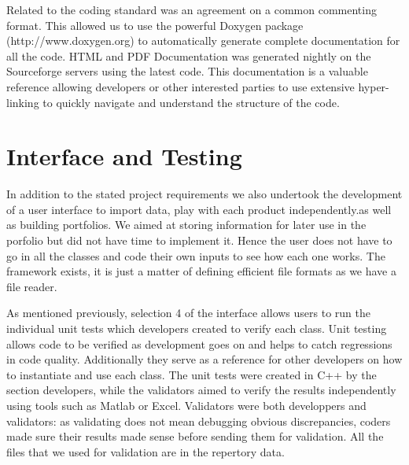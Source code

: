 Related to the coding standard was an agreement on a common commenting format.  This allowed us to use the powerful Doxygen package (http://www.doxygen.org) to automatically generate complete documentation for all the code.  HTML and PDF Documentation was generated nightly on the Sourceforge servers using the latest code.  This documentation is a valuable reference allowing developers or other interested parties to use extensive hyper-linking to quickly navigate and understand the structure of the code.

\section{Interface and Testing}

In addition to the stated project requirements we also undertook the development of a user interface to import data, play with each product independently.as well as building portfolios. We aimed at storing information for later use in the porfolio but did not have time to implement it. Hence the user does not have to go in all the classes and code their own inputs to see how each one works. The framework exists, it is just a matter of defining efficient file formats as we have a file reader.

As mentioned previously, selection 4 of the interface allows users to run the individual unit tests which developers created to verify each class. Unit testing allows code to be verified as development goes on and helps to catch regressions in code quality.  Additionally they serve as a reference for other developers on how to instantiate and use each class.  The unit tests were created in C++ by the section developers, while the validators aimed to verify the results independently using tools such as Matlab or Excel. Validators were both developpers and validators: as validating does not mean debugging obvious discrepancies, coders made sure their results made sense before sending them for validation. All the files that we used for validation are in the repertory data.